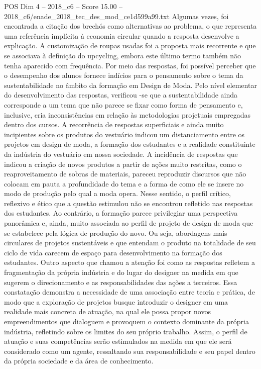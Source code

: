 \begin{textsample}{POS Dim 4 – 2018\_c6 – Score 15.00 – 2018\_c6/enade\_2018\_tec\_des\_mod\_ce1d599a99.txt}
Algumas vezes, foi encontrada a citação dos brechós como alternativas ao problema, o que representa uma referência implícita à economia circular quando a resposta desenvolve a explicação.
A customização de roupas usadas foi a proposta mais recorrente e que se associava à definição do upcycling, embora este último termo também não tenha aparecido com frequência.
Por meio das respostas, foi possível perceber que o desempenho dos alunos fornece indícios para o pensamento sobre o tema da sustentabilidade no âmbito da formação em Design de Moda.
Pelo nível elementar do desenvolvimento das respostas, verificou -se que a sustentabilidade ainda corresponde a um tema que não parece se fixar como forma de pensamento e, inclusive, cria inconsistências em relação às metodologias projetuais empregadas dentro dos cursos.
A recorrência de respostas superficiais e ainda muito incipientes sobre os produtos do vestuário indicou um distanciamento entre os projetos em design de moda, a formação dos estudantes e a realidade constituinte da indústria do vestuário em nossa sociedade.
A incidência de respostas que indicou a criação de novos produtos a partir de ações muito restritas, como o reaproveitamento de sobras de materiais, pareceu reproduzir discursos que não colocam em pauta a profundidade do tema e a forma de como ele se insere no modo de produção pelo qual a moda opera.
Nesse sentido, o perfil crítico, reflexivo e ético que a questão estimulou não se encontrou refletido nas respostas dos estudantes.
Ao contrário, a formação parece privilegiar uma perspectiva panorâmica e, ainda, muito associada ao perfil de projeto de design de moda que se estabelece pela lógica de produção do novo.
Ou seja, abordagens mais circulares de projetos sustentáveis e que entendam o produto na totalidade de seu ciclo de vida carecem de espaço para desenvolvimento na formação dos estudantes.
Outro aspecto que chamou a atenção foi como as respostas refletem a fragmentação da própria indústria e do lugar do designer na medida em que sugerem o direcionamento e as responsabilidades das ações a terceiros.
Essa constatação demonstra a necessidade de uma associação entre teoria e prática, de modo que a exploração de projetos busque introduzir o designer em uma realidade mais concreta de atuação, na qual ele possa propor novos empreendimentos que dialoguem e provoquem o contexto dominante da própria indústria, refletindo sobre os limites do seu próprio trabalho.
Assim, o perfil de atuação e suas competências serão estimulados na medida em que ele será considerado como um agente, ressaltando sua responsabilidade e seu papel dentro da própria sociedade e da área de conhecimento.

\end{textsample}
